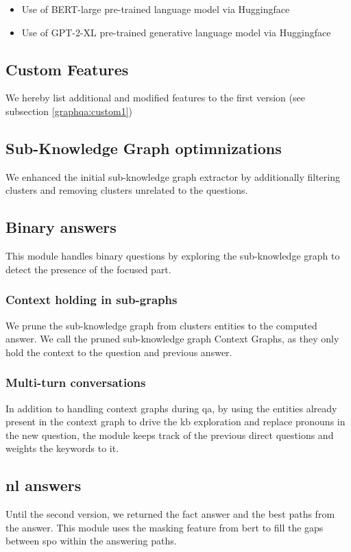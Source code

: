\begin{itemize}
    \setlength\itemsep{0em}
    \item Use of BERT-large pre-trained language model via Huggingface
    \item Use of GPT-2-XL pre-trained generative language model via Huggingface
\end{itemize}

\subsection{Custom Features}
We hereby list additional and modified features to the first version (see subsection \ref{graphqa:custom1})

\subsection{Sub-Knowledge Graph optimnizations}
We enhanced the initial sub-knowledge graph extractor by additionally filtering clusters and removing clusters unrelated to the questions.

\subsection{Binary answers}
This module handles binary questions by exploring the sub-knowledge graph to detect the presence of the focused part.

\subsubsection{Context holding in sub-graphs}
We prune the sub-knowledge graph from clusters entities to the computed answer. We call the pruned sub-knowledge graph Context Graphs, as they only hold the context to the question and previous answer.

\subsubsection{Multi-turn conversations}
In addition to handling context graphs during \gls{qa}, by using the entities already present in the context graph to drive the \gls{kb} exploration and replace pronouns in the new question, the module keeps track of the previous direct questions and weights the keywords to it.

\subsection{\gls{nl} answers}
Until the second version, we returned the fact answer and the best paths from the answer. This module uses the masking feature from \gls{bert} \autocite{paper:devlin-etal-2019-bert} to fill the gaps between \gls{spo} within the answering paths.

